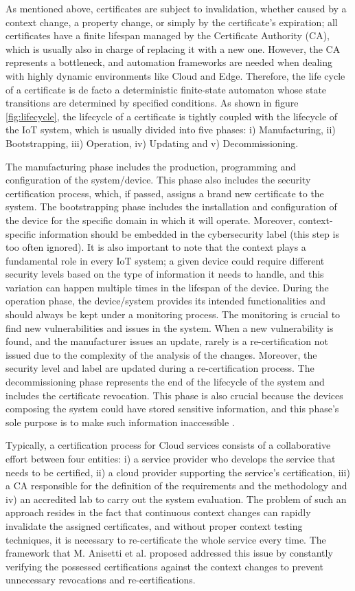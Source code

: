 As mentioned above, certificates are subject to invalidation, whether caused by a context change, a property change, or simply by the certificate's expiration; all certificates have a finite lifespan managed by the Certificate Authority (CA), which is usually also in charge of replacing it with a new one. However, the CA represents a bottleneck, and automation frameworks are needed when dealing with highly dynamic environments like Cloud and Edge. Therefore, the life cycle of a certificate is de facto a deterministic finite-state automaton whose state transitions are determined by specified conditions. As shown in figure \ref{fig:lifecycle}, the lifecycle of a certificate is tightly coupled with the lifecycle of the IoT system, which is usually divided into five phases: i) Manufacturing, ii) Bootstrapping, iii) Operation, iv) Updating and v) Decommissioning. 

The manufacturing phase includes the production, programming and configuration of the system/device. This phase also includes the security certification process, which, if passed, assigns a brand new certificate to the system. The bootstrapping phase includes the installation and configuration of the device for the specific domain in which it will operate. Moreover, context-specific information should be embedded in the cybersecurity label (this step is too often ignored). It is also important to note that the context plays a fundamental role in every IoT system; a given device could require different security levels based on the type of information it needs to handle, and this variation can happen multiple times in the lifespan of the device. During the operation phase, the device/system provides its intended functionalities and should always be kept under a monitoring process. The monitoring is crucial to find new vulnerabilities and issues in the system. When a new vulnerability is found, and the manufacturer issues an update, rarely is a re-certification not issued due to the complexity of the analysis of the changes. Moreover, the security level and label are updated during a re-certification process. The decommissioning phase represents the end of the lifecycle of the system and includes the certificate revocation. This phase is also crucial because the devices composing the system could have stored sensitive information, and this phase's sole purpose is to make such information inaccessible \cite{surveyIOT}.

Typically, a certification process for Cloud services consists of a collaborative effort between four entities: i) a service provider who develops the service that needs to be certified, ii) a cloud provider supporting the service's certification, iii) a CA responsible for the definition of the requirements and the methodology and iv) an accredited lab to carry out the system evaluation. The problem of such an approach resides in the fact that continuous context changes can rapidly invalidate the assigned certificates, and without proper context testing techniques, it is necessary to re-certificate the whole service every time. The framework that M. Anisetti et al. proposed addressed this issue by constantly verifying the possessed certifications against the context changes to prevent unnecessary revocations and re-certifications.


